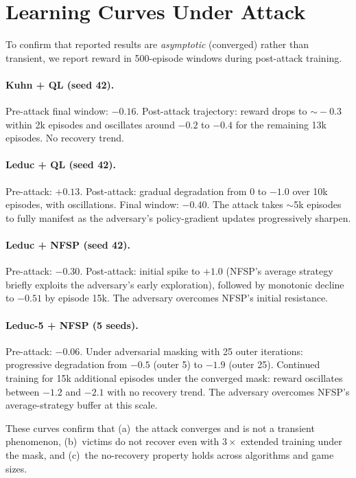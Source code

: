 \documentclass{article}
\begin{document}
\section{Learning Curves Under Attack}
\label{app:curves}

To confirm that reported results are \emph{asymptotic} (converged) rather than transient, we report reward in 500-episode windows during post-attack training.

\paragraph{Kuhn + QL (seed 42).}
Pre-attack final window: $-0.16$. Post-attack trajectory: reward drops to $\sim\!-0.3$ within 2k episodes and oscillates around $-0.2$ to $-0.4$ for the remaining 13k episodes. No recovery trend.

\paragraph{Leduc + QL (seed 42).}
Pre-attack: $+0.13$. Post-attack: gradual degradation from $0$ to $-1.0$ over 10k episodes, with oscillations. Final window: $-0.40$. The attack takes $\sim$5k episodes to fully manifest as the adversary's policy-gradient updates progressively sharpen.

\paragraph{Leduc + NFSP (seed 42).}
Pre-attack: $-0.30$. Post-attack: initial spike to $+1.0$ (NFSP's average strategy briefly exploits the adversary's early exploration), followed by monotonic decline to $-0.51$ by episode 15k. The adversary overcomes NFSP's initial resistance.

\paragraph{Leduc-5 + NFSP (5 seeds).}
Pre-attack: $-0.06$. Under adversarial masking with 25 outer iterations: progressive degradation from $-0.5$ (outer 5) to $-1.9$ (outer 25). Continued training for 15k additional episodes under the converged mask: reward oscillates between $-1.2$ and $-2.1$ with no recovery trend. The adversary overcomes NFSP's average-strategy buffer at this scale.

These curves confirm that (a)~the attack converges and is not a transient phenomenon, (b)~victims do not recover even with $3\times$ extended training under the mask, and (c)~the no-recovery property holds across algorithms and game sizes.


\end{document}
